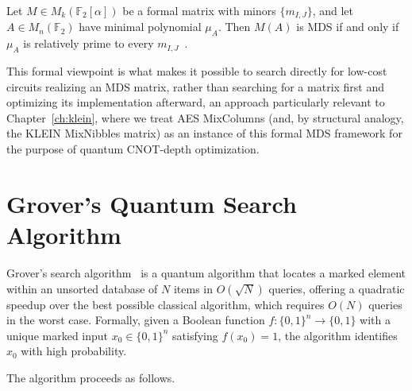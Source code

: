 \begin{proposition}
\label{prop:instantiation}
Let $M \in M_k(\mathbb{F}_2[\alpha])$ be a formal matrix with minors
$\{m_{I,J}\}$, and let $A \in M_n(\mathbb{F}_2)$ have minimal polynomial
$\mu_A$. Then $M(A)$ is MDS if and only if $\mu_A$ is relatively prime to
every $m_{I,J}$~\cite{duval2018mds}.
\end{proposition}

This formal viewpoint is what makes it possible to search directly for
low-cost circuits realizing an MDS matrix, rather than searching for a
matrix first and optimizing its implementation afterward, an approach
particularly relevant to Chapter~\ref{ch:klein}, where we treat AES MixColumns
(and, by structural analogy, the KLEIN MixNibbles matrix) as an instance of
this formal MDS framework for the purpose of quantum CNOT-depth optimization.

\section{Grover's Quantum Search Algorithm}
\label{sec:grovers-algorithm}

Grover's search algorithm~\cite{grover1996fast} is a quantum algorithm that
locates a marked element within an unsorted database of $N$ items in
$O(\sqrt{N})$ queries, offering a quadratic speedup over the best possible
classical algorithm, which requires $O(N)$ queries in the worst case. Formally,
given a Boolean function $f : \{0,1\}^n \to \{0,1\}$ with a unique marked input
$x_0 \in \{0,1\}^n$ satisfying $f(x_0) = 1$, the algorithm identifies $x_0$ with
high probability.

The algorithm proceeds as follows.

